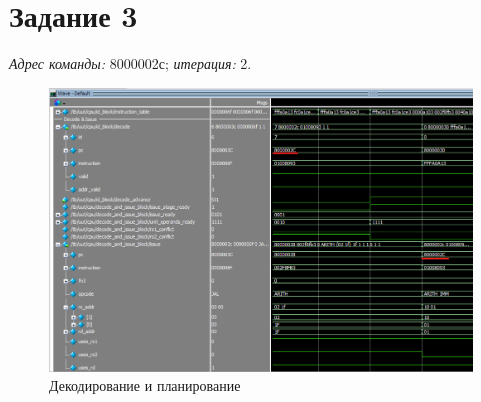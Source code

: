\section{Задание 3}
\textit{Адрес команды: }8000002с; \textit{итерация: }2. 

\begin{figure}[ht!]
\centering
\includegraphics[width=170mm]{./img/task3.png}
\caption{Декодирование и планирование \label{overflow}}
\end{figure}

